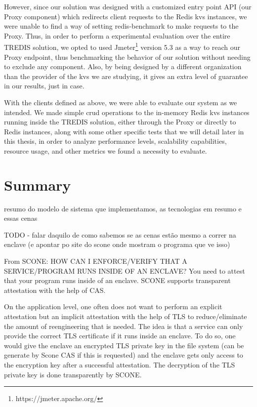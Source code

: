 However, since our solution was designed with a customized entry point API (our Proxy component) which redirects client requests to the Redis \gls{kvs} instances, we were unable to find a way of setting redis-benchmark to make requests to the Proxy. 
Thus, in order to perform a experimental evaluation over the entire TREDIS solution, we opted to used Jmeter\footnote{https://jmeter.apache.org/} version 5.3 as a way to reach our Proxy endpoint, thus benchmarking the behavior of our solution without needing to exclude any component. Also, by being designed by a different organization than the provider of the \gls{kvs} we are studying, it gives an extra level of guarantee in our results, just in case.

With the clients defined as above, we were able to evaluate our system as we intended. 
We made simple \gls{crud} operations to the in-memory Redis \gls{kvs} instances running inside the TREDIS solution, either through the Proxy or directly to Redis instances, along with some other specific tests that we will detail later in this thesis, in order to analyze performance levels, scalability capabilities, resource usage, and other metrics we found a necessity to evaluate.



\section{Summary}
\label{sec:implementationSummary}


resumo do modelo de sistema que implementamos, as tecnologias em resumo e essas cenas

TODO - falar daquilo de como sabemos se as cenas estão mesmo a correr na enclave (e apontar po site do scone onde mostram o programa que ve isso)

From SCONE: 
HOW CAN I ENFORCE/VERIFY THAT A SERVICE/PROGRAM RUNS INSIDE OF AN ENCLAVE?
You need to attest that your program runs inside of an enclave. SCONE supports transparent attestation with the help of CAS.

On the application level, one often does not want to perform an explicit attestation but an implicit attestation with the help of TLS to reduce/eliminate the amount of reengineering that is needed. The idea is that a service can only provide the correct TLS certificate if it runs inside an enclave. To do so, one would give the enclave an encrypted TLS private key in the file system (can be generate by Scone CAS if this is requested) and the enclave gets only access to the encryption key after a successful attestation. The decryption of the TLS private key is done transparently by SCONE.


